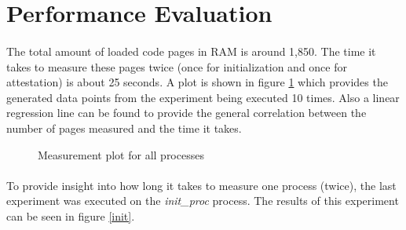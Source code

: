 \section{Performance Evaluation}

\paragraph*{}
The total amount of loaded code pages in RAM is around 1,850. The time it takes to measure these pages twice (once for initialization and once for attestation) is about 25 seconds. A plot is shown in figure \ref{graph} which provides the generated data points from the experiment being executed 10 times. Also a linear regression line can be found to provide the general correlation between the number of pages measured and the time it takes.

\begin{figure}[h!]
\caption{Measurement plot for all processes}
\label{graph}
\end{figure}

\paragraph*{}
To provide insight into how long it takes to measure one process (twice), the last experiment was executed on the \textit{init\_proc} process. The results of this experiment can be seen in figure \ref{init}.

